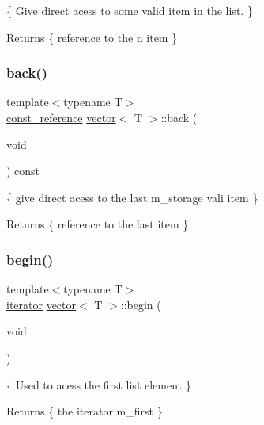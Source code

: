 \{ Give direct acess to some valid item in the list. \} 

\begin{DoxyReturn}{Returns}
\{ reference to the n item \} 
\end{DoxyReturn}
\mbox{\label{classvector_a83cb5f4dec5bbecea7267cf1981f2314}} 
\subsubsection{\texorpdfstring{back()}{back()}}
{\footnotesize\ttfamily template$<$typename T$>$ \\
\hyperlink{classvector_aad263433b4072dfbc26ace0df6441960}{const\+\_\+reference} \hyperlink{classvector}{vector}$<$ T $>$\+::back (\begin{DoxyParamCaption}\item[{void}]{ }\end{DoxyParamCaption}) const\hspace{0.3cm}{\ttfamily [inline]}}



\{ give direct acess to the last m\+\_\+storage vali item \} 

\begin{DoxyReturn}{Returns}
\{ reference to the last item \} 
\end{DoxyReturn}
\mbox{\label{classvector_a22ebe2c584d5e94106e10eef4e8d7baa}} 
\subsubsection{\texorpdfstring{begin()}{begin()}\hspace{0.1cm}{\footnotesize\ttfamily [1/2]}}
{\footnotesize\ttfamily template$<$typename T$>$ \\
\hyperlink{classMyIterator}{iterator} \hyperlink{classvector}{vector}$<$ T $>$\+::begin (\begin{DoxyParamCaption}\item[{void}]{ }\end{DoxyParamCaption})\hspace{0.3cm}{\ttfamily [inline]}}



\{ Used to acess the first list element \} 

\begin{DoxyReturn}{Returns}
\{ the iterator m\+\_\+first \} 
\end{DoxyReturn}
\mbox{\label{classvector_a117f81304b9a47b95414c658ed25070f}} 
